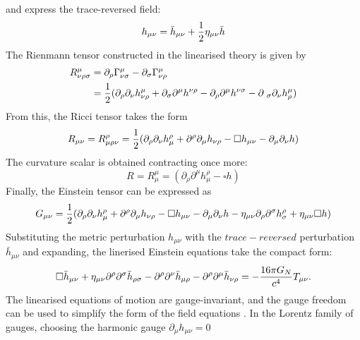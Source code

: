 \documentclass[binding=0.6cm, LaM]{sapthesis}
\begin{document}
	and express the trace-reversed field:
		\begin{equation}
			h_{\mu\nu} = {\bar h}_{\mu\nu} + {1 \over {2}}\eta_{\mu\nu}{\bar h}
		\end{equation}
	The Rienmann tensor constructed in the linearised theory is given by
		\begin{align}
			R^{\mu}_{\nu\rho\sigma} &= \partial_{\rho} \Gamma^{\mu}_{\nu\sigma} - \partial_{\sigma}\Gamma^{\mu}_{\nu\rho}  \\
				       &= {1 \over 2} (\partial_{\rho}\partial_{\nu}h^{\mu}_{\nu\rho} + \partial_{\sigma}\partial^{\mu}h^{\nu\rho} - \partial_{\rho}\partial^{\mu}h^{\nu\sigma} - \partial_{\					     \sigma}\partial_{\nu}h^{\mu}_{\rho})
		\end{align}
	From this, the Ricci tensor takes the form
		\begin{equation}
			R_{\mu\nu} = R^{\rho}_{\mu\rho\nu} = {1 \over 2}(\partial_{\rho}\partial_{\nu}h^{\rho}_{\mu} + \partial^{\rho}\partial_{\mu}h_{\nu\rho} - \square h_{\mu\nu} - \partial_{\mu}\partial_{\nu}h)
		\end{equation}
	The curvature scalar is obtained contracting once more:
		\begin{equation}
			R = R^{\mu}_{\mu} = (\partial_{\rho}\partial^{\mu}h^{\rho}_{\mu} - \square h)
		\end{equation}
	Finally, the Einstein tensor can be expressed as
		\begin{equation}
			G_{\mu\nu} = {1 \over 2}(\partial_{\rho}\partial_{\nu}h^{\rho}_{\mu} + \partial^{\rho}\partial_{\mu}h_{\nu\rho} - \square h_{\mu\nu} - \partial_{\mu}\partial_{\nu}h - \eta_{\mu\nu}\partial_{\rho}\partial^{\sigma}h^{\rho}_{\sigma} + \eta_{\mu\nu}\square h)
		\end{equation}
	Substituting the metric perturbation $h_{\mu\nu}$  with the $trace-reversed$ perturbation ${\bar h}_{\mu\nu}$ and expanding, 
	the linerised Einstein equations take the compact form:
		\begin{equation}
			\square {\bar h}_{\mu\nu} + \eta_{\mu\nu}{\partial}^{\rho}{\partial}^{\sigma}{\bar h}_{\rho\sigma} - {\partial}^{\rho}{\partial}^{\nu}{\bar h}_{\mu\rho} - {\partial}^{\rho}{\partial}^{\mu}{\bar h}_{\nu\rho} = - {{16\pi G_{N}} \over {c^4}}T_{\mu\nu}.
		\end{equation}
	The linearised equations of motion are gauge-invariant, and the gauge freedom can
 	be used to simplify the form of the field equations \cite{17}.
 	In the Lorentz family of gauges, choosing the harmonic gauge $ \partial_{\mu}h_{\mu\nu} = 0 $ 
\end{document}
